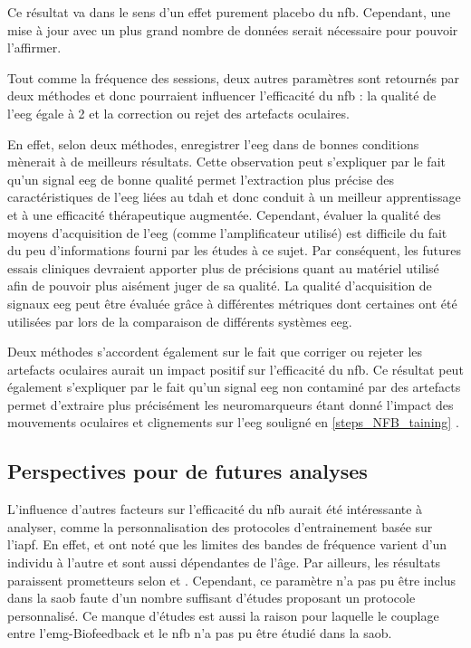 Ce résultat va dans le sens d'un effet purement placebo du \gls{nfb}. Cependant, une mise à jour avec un plus grand nombre de données serait nécessaire pour pouvoir l'affirmer.

Tout comme la fréquence des sessions, deux autres paramètres sont retournés par deux méthodes et donc pourraient influencer 
l'efficacité du \gls{nfb} : la qualité de l'\gls{eeg} égale à 2 et la correction ou rejet des artefacts oculaires.

En effet, selon deux méthodes, enregistrer l'\gls{eeg} dans de bonnes conditions mènerait à de meilleurs résultats. Cette observation peut s'expliquer par le fait qu'un signal
\gls{eeg} de bonne qualité permet l'extraction plus précise des caractéristiques de l'\gls{eeg} liées au \gls{tdah} et donc conduit à un meilleur apprentissage et 
à une efficacité thérapeutique augmentée. Cependant, évaluer la qualité des moyens d'acquisition de l'\gls{eeg} (comme l'amplificateur utilisé) 
est difficile du fait du peu d'informations fourni par les études à ce sujet. Par conséquent, les futures essais cliniques devraient apporter plus 
de précisions quant au matériel utilisé afin de pouvoir plus aisément juger de sa qualité. La qualité d'acquisition de signaux \gls{eeg} peut être évaluée grâce à différentes
métriques dont certaines ont été utilisées par \citep{Bussalb2018benchmark} lors de la comparaison de différents systèmes \gls{eeg}. 

Deux méthodes s'accordent également sur le fait que corriger ou rejeter les artefacts oculaires aurait un impact positif sur l'efficacité du \gls{nfb}. Ce résultat peut également
s'expliquer par le fait qu'un signal \gls{eeg} non contaminé par des artefacts permet d'extraire plus précisément les neuromarqueurs \citep{Barthelemy2017, Barthelemy2019} étant donné l'impact
des mouvements oculaires et clignements sur l'\gls{eeg} souligné en \ref{steps_NFB_taining} \citep{Iwasaki2005}. 

\subsection{Perspectives pour de futures analyses}

L'influence d'autres facteurs sur l'efficacité du \gls{nfb} aurait été intéressante à analyser, comme la personnalisation des 
protocoles d'entrainement basée sur l'\gls{iapf}. En effet, \citet{Vernon2004} et \citet{Klimesch1999} ont noté que les limites des bandes 
de fréquence varient d'un individu à l'autre et sont aussi dépendantes de l'âge. Par ailleurs, les résultats paraissent prometteurs selon 
\citet{Bazanova2018, Escolano2014} et \citet{Alkoby2017}. Cependant, ce paramètre n'a pas pu être inclus dans la \gls{saob} faute d'un 
nombre suffisant d'études proposant un protocole personnalisé. Ce manque d'études est aussi la raison pour laquelle le couplage entre l'\gls{emg}-Biofeedback 
et le \gls{nfb} n'a pas pu être étudié dans la \gls{saob}. 

